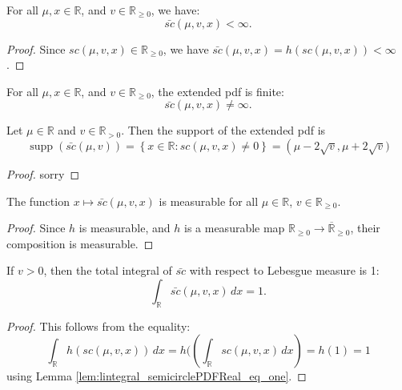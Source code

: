 \begin{lemma}
  \leanok
  \label{lem:semicirclePDF_finite}
  For all $\mu, x \in \mathbb{R}$, and $v \in \mathbb{R}_{\ge 0}$, we have:
    $$ 
    \bar{sc}(\mu,v,x) < \infty.
    $$ 
\end{lemma}
\begin{proof}
Since $sc(\mu,v,x) \in \mathbb{R}_{\ge 0}$, we have $\bar{sc}(\mu,v,x) = h(sc(\mu,v,x)) < \infty$.
\end{proof}

\begin{lemma}
  \leanok
  \label{lem:semicirclePDF_ne_top}
  For all \( \mu, x \in \mathbb{R} \), and \( v \in \mathbb{R}_{\ge 0} \), the extended pdf is finite:
  \[
    \bar{sc}(\mu,v,x) \ne \infty.
  \]
\end{lemma}

\begin{lemma}
  \leanok
  \label{lem:support_semicirclePDF}
  Let \( \mu \in \mathbb{R} \) and \( v \in \mathbb{R}_{> 0} \). Then the support of the extended pdf is
  \[
      \operatorname{supp}(\bar{sc}(\mu,v)) = \left\{ x \in \mathbb{R} : sc(\mu,v,x) \ne 0 \right\}
    = \left(\mu - 2\sqrt{v}, \mu + 2\sqrt{v})\right.
  \]
\end{lemma}
\begin{proof}
    sorry
\end{proof}

\begin{lemma}
  \leanok
  \label{lem:measurable_semicirclePDF}
  The function \( x \mapsto \bar{sc}(\mu,v,x) \) is measurable for all \( \mu \in \mathbb{R} \), \( v \in \mathbb{R}_{\ge 0} \).
\end{lemma}
\begin{proof}
  Since $h$ is measurable, and $h$ is a measurable map \( \mathbb{R}_{\ge 0} \to \overline{\mathbb{R}}_{\ge 0} \), their composition is measurable.
\end{proof}

\begin{lemma}
  \leanok
  \label{lem:lintegral_semicirclePDF_eq_one}
  If $v > 0$, then the total integral of $\bar{sc}$ with respect to Lebesgue measure is 1:
  \[
      \int_{\mathbb{R}} \bar{sc}(\mu,v,x) \, dx = 1.
  \]
\end{lemma}
\begin{proof}
  This follows from the equality:
  \[
  \int_{\mathbb{R}} h(sc(\mu,v,x)) \, dx = h( \left( \int_{\mathbb{R}} sc(\mu,v,x) \, dx \right) = h(1) = 1
  \]
  using Lemma \ref{lem:lintegral_semicirclePDFReal_eq_one}.
\end{proof}

